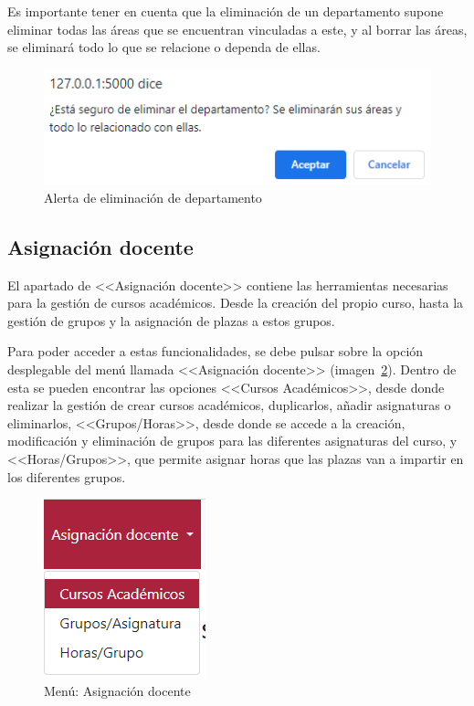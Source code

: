 Es importante tener en cuenta que la eliminación de un departamento supone eliminar todas las áreas que se encuentran vinculadas a este, y al borrar las áreas, se eliminará todo lo que se relacione o dependa de ellas.

\begin{figure}
	\centering
	\includegraphics[width=.65\textwidth]{../img/Anexos/Manual usuario/alertElDepartamento.png}
	\caption{Alerta de eliminación de departamento}\label{pag:alertElDepartamento}
\end{figure}

\subsection{Asignación docente}
El apartado de <<Asignación docente>> contiene las herramientas necesarias para la gestión de cursos académicos.
Desde la creación del propio curso, hasta la gestión de grupos y la asignación de plazas a estos grupos.

Para poder acceder a estas funcionalidades, se debe pulsar sobre la opción desplegable del menú llamada <<Asignación docente>> (imagen~\ref{pag:menuAsigDoc}).
Dentro de esta se pueden encontrar las opciones <<Cursos Académicos>>, desde donde realizar la gestión de crear cursos académicos, duplicarlos, añadir asignaturas o eliminarlos, <<Grupos/Horas>>, desde donde se accede a la creación, modificación y eliminación de grupos para las diferentes asignaturas del curso, y <<Horas/Grupos>>, que permite asignar horas que las plazas van a impartir en los diferentes grupos.

\begin{figure}
	\centering
	\includegraphics[width=.33\textwidth]{../img/Anexos/Manual usuario/menu asg doc.png}
	\caption{Menú: Asignación docente}\label{pag:menuAsigDoc}
\end{figure}

